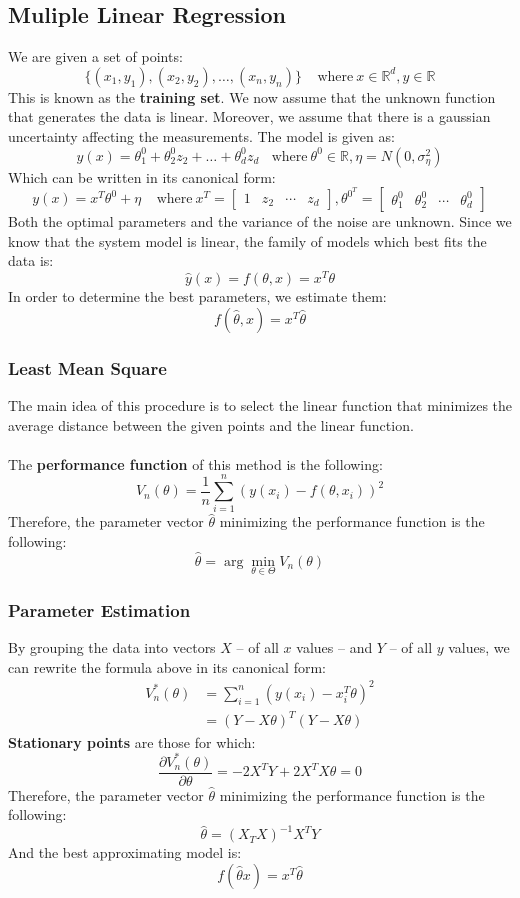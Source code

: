 \documentclass{article}
\begin{document}
\subsection{Muliple Linear Regression}
We are given a set of points:
\[ \{ (x_1, y_1), (x_2, y_2), \dots, (x_n, y_n) \} ~~~~~ \text{where}~x \in \mathbb{R}^d, y \in 	\mathbb{R} \]
This is known as the \textbf{training set}. We now assume that the unknown function that generates the data is linear. Moreover, we assume that there is a gaussian uncertainty affecting the measurements. The model is given as:
\[ y(x) = \theta^0_1 + \theta^0_2 z_2 + \dots + \theta^0_d z_d ~~~~ \text{where}~\theta^0 \in \mathbb{R}, \eta = N(0, \sigma^2_\eta) \]
Which can be written in its canonical form:
\[ y(x) = x^T \theta^0 + \eta ~~~~~ \text{where}~x^T = \begin{bmatrix} 1 & z_2 & \cdots & z_d \end{bmatrix}, \theta^{0^T} = \begin{bmatrix} \theta^0_1 & \theta^0_2 & \cdots & \theta^0_d \end{bmatrix} \]
Both the optimal parameters and the variance of the noise are unknown. Since we know that the system model is linear, the family of models which best fits the data is:
\[ \hat y(x) = f(\theta, x) = x^T \theta \]
In order to determine the best parameters, we estimate them:
\[ f(\hat \theta, x) = x^T \hat \theta \]

\subsubsection{Least Mean Square}
The main idea of this procedure is to select the linear function that minimizes the average distance between the given points and the linear function. \\ \\
The \textbf{performance function} of this method is the following:
\[ V_n(\theta) = \frac{1}{n} \sum^n_{i=1}(y(x_i) - f(\theta, x_i))^2 \]
Therefore, the parameter vector $\hat \theta$ minimizing the performance function is the following:
\[ \hat \theta  = \arg\min_{\theta \in \Theta} V_n(\theta) \]

\subsubsection{Parameter Estimation}
By grouping the data into vectors $X$ -- of all $x$ values -- and $Y$ -- of all $y$ values, we can rewrite the formula above in its canonical form:
\begin{align*}
	V_n^*(\theta) &= \sum^n_{i=1} (y(x_i) - x^T_i \theta)^2 \\
	&= (Y - X\theta)^T (Y - X\theta) 
\end{align*}
\textbf{Stationary points} are those for which:
\[ \frac{\partial V_n^*(\theta)}{\partial \theta} = -2X^T Y + 2X^T X \theta = 0 \]
Therefore, the parameter vector $\hat \theta$ minimizing the performance function is the following:
\[ \hat \theta = (X_TX)^{-1}X^TY \]
And the best approximating model is:
\[ f(\hat \theta x) = x^T\hat\theta \]
\end{document}
